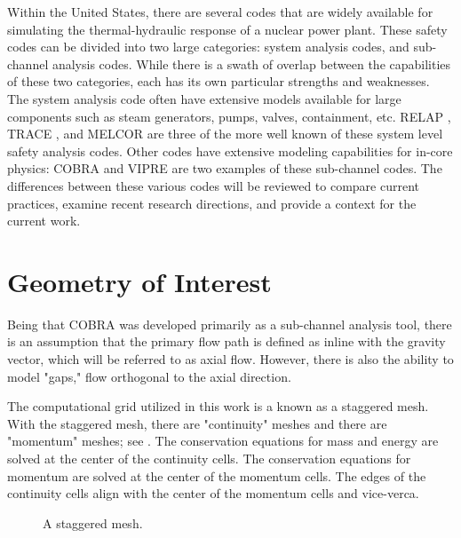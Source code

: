 Within the United States, there are several codes that are widely available for simulating the thermal-hydraulic response of a nuclear power plant.
These safety codes can be divided into two large categories: system analysis codes, and sub-channel analysis codes.
While there is a swath of overlap between the capabilities of these two categories, each has its own particular strengths and weaknesses.
The system analysis code often have extensive models available for large components such as steam generators, pumps, valves, containment, etc.
RELAP \cite{RELAP}, TRACE \cite{TRACE}, and MELCOR \cite{Summers1994} are three of the more well known of these system level safety analysis codes.
Other codes have extensive modeling capabilities for in-core physics: COBRA \cite{Thurgood1983c} and VIPRE are two examples of these sub-channel codes.
The differences between these various codes will be reviewed to compare current practices, examine recent research directions, and provide a context for the current work.

\section{Geometry of Interest}
\label{sect:topology}
Being that COBRA was developed primarily as a sub-channel analysis tool, there is an assumption that the primary flow path is defined as inline with the gravity vector, which will be referred to as axial flow.
However, there is also the ability to model "gaps," flow orthogonal to the axial direction.

The computational grid utilized in this work is a known as a staggered mesh.
With the staggered mesh, there are "continuity" meshes and there are "momentum" meshes; see .
The conservation equations for mass and energy are solved at the center of the continuity cells.
The conservation equations for momentum are solved at the center of the momentum cells.
The edges of the continuity cells align with the center of the momentum cells and vice-verca.

\begin{figure}[ht]
\caption{A staggered mesh.}
\label{fig:staggered_mesh}
\begin{center}
\end{center}
\end{figure}

